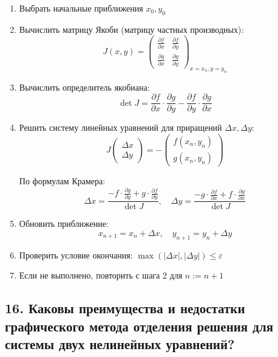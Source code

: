\documentclass[a4paper,12pt]{article}
\begin{document}
\begin{enumerate}
    \item Выбрать начальные приближения $x_0, y_0$
    
    \item Вычислить матрицу Якоби (матрицу частных производных):
    \[
        J(x, y) = \begin{pmatrix} \frac{\partial f}{\partial x} & \frac{\partial f}{\partial y} \\ \frac{\partial g}{\partial x} & \frac{\partial g}{\partial y} \end{pmatrix}_{x=x_n, y=y_n}
    \]
    
    \item Вычислить определитель якобиана:
    \[
        \det J = \frac{\partial f}{\partial x} \cdot \frac{\partial g}{\partial y} - \frac{\partial f}{\partial y} \cdot \frac{\partial g}{\partial x}
    \]
    
    \item Решить систему линейных уравнений для приращений $\Delta x, \Delta y$:
    \[
        J \begin{pmatrix} \Delta x \\ \Delta y \end{pmatrix} = -\begin{pmatrix} f(x_n, y_n) \\ g(x_n, y_n) \end{pmatrix}
    \]
    
    По формулам Крамера:
    \[
        \Delta x = \frac{-f \cdot \frac{\partial g}{\partial y} + g \cdot \frac{\partial f}{\partial y}}{\det J}, \quad
        \Delta y = \frac{-g \cdot \frac{\partial f}{\partial x} + f \cdot \frac{\partial g}{\partial x}}{\det J}
    \]
    
    \item Обновить приближение:
    \[
        x_{n+1} = x_n + \Delta x, \quad y_{n+1} = y_n + \Delta y
    \]
    
    \item Проверить условие окончания: $\max(|\Delta x|, |\Delta y|) \leq \varepsilon$
    
    \item Если не выполнено, повторить с шага 2 для $n := n+1$
\end{enumerate}

\subsection*{16. Каковы преимущества и недостатки графического метода отделения решения для системы двух нелинейных уравнений?}
\end{document}
